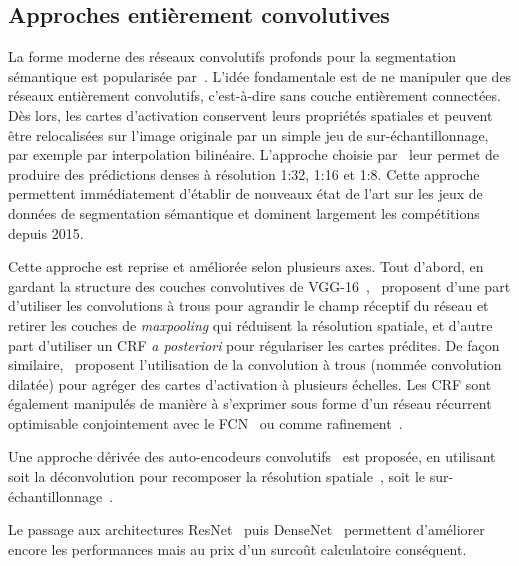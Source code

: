 \subsection{Approches entièrement convolutives}


La forme moderne des réseaux convolutifs profonds pour la segmentation sémantique est popularisée par~\citet{long_fully_2015}. L'idée fondamentale est de ne manipuler que des réseaux entièrement convolutifs, c'est-à-dire sans couche entièrement connectées. Dès lors, les cartes d'activation conservent leurs propriétés spatiales et peuvent être relocalisées sur l'image originale par un simple jeu de sur-échantillonnage, par exemple par interpolation bilinéaire. L'approche choisie par~\citet{long_fully_2015} leur permet de produire des prédictions denses à résolution 1:32, 1:16 et 1:8. Cette approche permettent immédiatement d'établir de nouveaux état de l'art sur les jeux de données de segmentation sémantique et dominent largement les compétitions depuis 2015.

Cette approche est reprise et améliorée selon plusieurs axes. Tout d'abord, en gardant la structure des couches convolutives de VGG-16~\cite{simonyan_very_2014},~\citet{l._c._chen_deeplab_2018} proposent d'une part d'utiliser les convolutions à trous pour agrandir le champ réceptif du réseau et retirer les couches de \emph{maxpooling} qui réduisent la résolution spatiale, et d'autre part d'utiliser un \gls{CRF} \emph{a posteriori} pour régulariser les cartes prédites. De façon similaire,~\citet{yu_multi-scale_2015} proposent l'utilisation de la convolution à trous (nommée convolution dilatée) pour agréger des cartes d'activation à plusieurs échelles. Les \gls{CRF} sont également manipulés de manière à s'exprimer sous forme d'un réseau récurrent optimisable conjointement avec le \gls{FCN}~\cite{zheng_conditional_2015} ou comme rafinement~\cite{arnab_higher_2015}.

Une approche dérivée des auto-encodeurs convolutifs~\cite{zhao_stacked_2015-1} est proposée, en utilisant soit la déconvolution pour recomposer la résolution spatiale~\cite{ronneberger_u-net_2015,nekrasov_global_2016,noh_learning_2015}, soit le sur-échantillonnage~\cite{badrinarayanan_segnet_2017}.

Le passage aux architectures ResNet~\cite{wu_high-performance_2016} puis DenseNet~\cite{jegou_one_2017} permettent d'améliorer encore les performances mais au prix d'un surcoût calculatoire conséquent.

